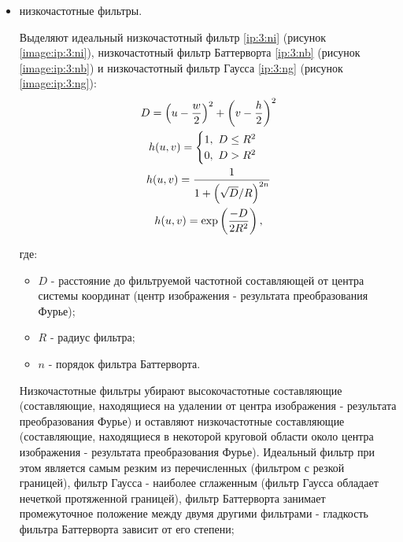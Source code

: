 \begin{itemize}

	\item низкочастотные фильтры.

	Выделяют идеальный низкочастотный фильтр \eqref{ip:3:ni} (рисунок \ref{image:ip:3:ni}), низкочастотный фильтр Баттерворта \eqref{ip:3:nb} (рисунок \ref{image:ip:3:nb}) и низкочастотный фильтр Гаусса \eqref{ip:3:ng} (рисунок \ref{image:ip:3:ng}):
	\begin{gather}
		\notag D = \left (u - \dfrac{w}{2} \right ) ^ 2 + \left (v - \dfrac{h}{2} \right ) ^ 2 \\
		\label{ip:3:ni} h(u, v) =
		\begin{cases}
			1 ,~ D \le R ^ 2 \\
			0 ,~ D > R ^ 2
		\end{cases} \\
		\label{ip:3:nb} h(u, v) = \dfrac{1}{1 + \left (\sqrt{D} / R \right )^{2n}} \\
		\label{ip:3:ng} h(u, v) = \exp \left ( \dfrac{- D}{2 R ^ 2} \right ),
	\end{gather}

	где:

	\begin{itemize}

		\item $D$ - расстояние до фильтруемой частотной составляющей от центра системы координат (центр изображения - результата преобразования Фурье);
		\item $R$ - радиус фильтра;
		\item $n$ - порядок фильтра Баттерворта.

	\end{itemize}

	Низкочастотные фильтры убирают высокочастотные составляющие (составляющие, находящиеся на удалении от центра изображения - результата преобразования Фурье) и оставляют низкочастотные составляющие (составляющие, находящиеся в некоторой круговой области около центра изображения - результата преобразования Фурье). Идеальный фильтр при этом является самым резким из перечисленных (фильтром с резкой границей), фильтр Гаусса - наиболее сглаженным (фильтр Гаусса обладает нечеткой протяженной границей), фильтр Баттерворта занимает промежуточное положение между двумя другими фильтрами - гладкость фильтра Баттерворта зависит от его степени;

\def\R{2}
\def\bp{1}

\noindent
\begin{tikzpicture}


\end{tikzpicture}
\end{itemize}
